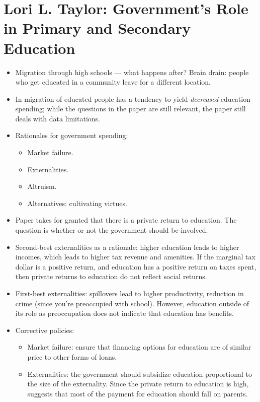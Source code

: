 \documentclass[10pt]{extarticle}
\begin{document}
  \section{Lori L. Taylor: Government's Role in Primary and Secondary Education}%
  \begin{itemize}
    \item Migration through high schools --- what happens after? Brain drain: people who get educated in a community leave for a different location.
    \item In-migration of educated people has a tendency to yield \textit{decreased} education spending; while the questions in the paper are still relevant, the paper still deals with data limitations.
    \item Rationales for government spending:
      \begin{itemize}
        \item Market failure.
        \item Externalities.
        \item Altruism.
        \item Alternatives: cultivating virtues.
      \end{itemize}
    \item Paper takes for granted that there is a private return to education. The question is whether or not the government should be involved.
    \item Second-best externalities as a rationale: higher education leads to higher incomes, which leads to higher tax revenue and amenities. If the marginal tax dollar is a positive return, and education has a positive return on taxes spent, then private returns to education do not reflect social returns.
    \item First-best externalities: spillovers lead to higher productivity, reduction in crime (since you're preoccupied with school). However, education outside of its role as preoccupation does not indicate that education has benefits.
    \item Corrective policies:
      \begin{itemize}
        \item Market failure: ensure that financing options for education are of similar price to other forms of loans.
        \item Externalities: the government should subsidize education proportional to the size of the externality. Since the private return to education is high, suggests that most of the payment for education should fall on parents.

\end{itemize}
\end{itemize}
\end{document}
